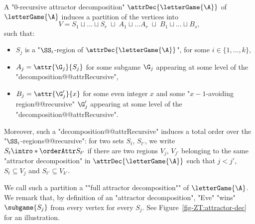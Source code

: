 \documentclass{theoretics}
\begin{document}
\begin{remark}\label{rmk-ZT:full-attractor-decomposition}
	A "$0$-recursive attractor decomposition" $\attrDec{\letterGame{\A}}$ of $\letterGame{\A}$ induces a partition of the vertices into
	\[ V = S_1 \sqcup \dots \sqcup S_r \; \sqcup \; A_1\sqcup\dots A_r \; \sqcup \;  B_1\sqcup \dots \sqcup B_s,  \]
	such that:
	\begin{itemize}
		\item $S_j$ is a "$\SS_i$-region of $\attrDec{\letterGame{\A}}$", for some $i\in \{1,\dots, k\}$,
		\item $A_j = \attr{\G_j}{S_j}$ for some subgame $\G_j$ appearing at some level of the "decomposition@@attrRecursive",
		\item $B_j = \attr{\G_j'}{x}$ for some even integer $x$ and some "$x-1$-avoiding region@@recursive" $\G_j'$  appearing at some level of the "decomposition@@attrRecursive".
	\end{itemize}

\AP Moreover, such a "decomposition@@attrRecursive" induces a total order over the "$\SS_i$-regions@@recursive": for two sets $S_t$, $S_{t'}$, we write $S_t \intro*\orderAttr S_{t'}$ if there are two regions $V_j$, $V_{j'}$ belonging to the same "attractor decomposition" in $\attrDec{\letterGame{\A}}$ such that $j<j'$, $S_t\subseteq V_j$ and $S_{t'}\subseteq V_{k'}$.

\AP We call such a partition a ""full attractor decomposition"" of $\letterGame{\A}$. We remark that, by definition of an "attractor decomposition", "Eve" "wins" $\subgame{S_j}$ from every vertex for every $S_j$.
See Figure~\ref{fig-ZT:attractor-dec} for an illustration.
\end{remark}
\end{document}
